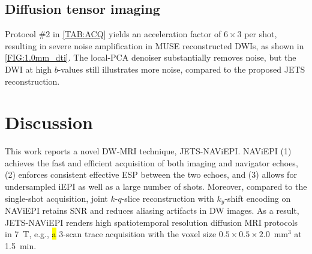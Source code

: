 \documentclass[preprint,12pt,authoryear,review]{elsarticle}
\begin{document}
    \subsection{Diffusion tensor imaging} %

    Protocol \#2 in \cref{TAB:ACQ} yields an acceleration factor of
    $6 \times 3$ per shot, resulting in severe noise amplification
    in MUSE reconstructed DWIs, as shown in \cref{FIG:1.0mm_dti}.
    The local-PCA denoiser substantially removes noise,
    but the DWI at high $b$-values still illustrates more noise,
    compared to the proposed JETS reconstruction.



    \clearpage

    \section{Discussion}
    \label{SEC:Disc}

    This work reports a novel DW-MRI technique, JETS-NAViEPI.
    NAViEPI (1) achieves the fast and efficient acquisition of
    both imaging and navigator echoes,
    (2) enforces consistent effective ESP between the two echoes, and
    (3) allows for undersampled iEPI as well as a large number of shots.
    Moreover, compared to the single-shot acquisition,
    joint $k$-$q$-slice reconstruction
    with $k_y$-shift encoding on NAViEPI
    retains SNR and reduces aliasing artifacts in DW images.
    As a result, JETS-NAViEPI renders high spatiotemporal resolution
    diffusion MRI protocols in \SI{7}{\tesla},
    e.g., \hl{a} 3-scan trace acquisition with the voxel size
    $0.5\times0.5\times2.0$~mm$^3$ at \SI{1.5}{\minute}.
\end{document}
